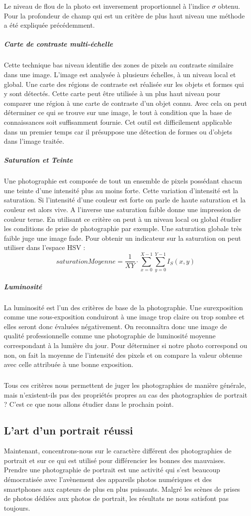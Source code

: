 \documentclass[11pt, french,screen]{report-rd-info}
\begin{document}
Le niveau de flou de la photo est inversement proportionnel à l’indice $\sigma$ obtenu. Pour la profondeur de champ qui est un critère de plus haut niveau une méthode a été expliquée précédemment.

\subparagraph{Carte de contraste multi-échelle}
Cette technique bas niveau identifie des zones de pixels au contraste similaire dans une image. L’image est analysée à plusieurs échelles, à un niveau local et global. Une carte des régions de contraste est réalisée sur les objets et formes qui y sont détectés. Cette carte peut être utilisée à un plus haut niveau pour comparer une région à une carte de contraste d’un objet connu. Avec cela on peut déterminer ce qui se trouve sur une image, le tout à condition que la base de connaissances soit suffisamment fournie. Cet outil est difficilement applicable dans un premier temps car il présuppose une détection de formes ou d’objets dans l’image traitée.
\subparagraph{Saturation et Teinte}
Une photographie est composée de tout un ensemble de pixels possédant chacun une teinte d’une intensité plus au moins forte. Cette variation d’intensité est la saturation. Si l’intensité d’une couleur est forte on parle de haute saturation et la couleur est alors vive. A l’inverse une saturation faible donne une impression de couleur terne. En utilisant ce critère on peut à un niveau local ou global étudier les conditions de prise de photographie par exemple. Une saturation globale très faible juge une image fade. Pour obtenir un indicateur sur la saturation on peut utiliser dans l'espace HSV : 
\begin{equation}
saturationMoyenne = \frac{1}{XY}\cdot \sum_{x=0}^{X-1} \sum_{y=0}^{Y-1} I_S(x,y)  
\end{equation}

\subparagraph{Luminosité}
La luminosité est l’un des critères de base de la photographie. Une surexposition  comme une sous-exposition conduiront à une image trop claire ou trop sombre et elles seront donc évaluées négativement. On reconnaîtra donc une image de qualité professionnelle comme une photographie de luminosité moyenne correspondant à la lumière du jour. Pour déterminer si notre photo correspond ou non, on fait la moyenne de l’intensité des pixels et on compare la valeur obtenue avec celle attribuée à une bonne exposition.
\subparagraph{}
Tous ces critères nous permettent de juger les photographies de manière générale, mais n'existent-ils pas des propriétés propres au cas des photographies de portrait ? C'est ce que nous allons étudier dans le prochain point.
\subsection{L’art d’un portrait réussi}
Maintenant, concentrons-nous sur le caractère différent des photographies de portrait et sur ce qui est utilisé pour différencier les bonnes des mauvaises.
Prendre une photographie de portrait est une activité qui s'est beaucoup démocratisée avec l'avènement des appareils photos numériques et des smartphones aux capteurs de plus en plus puissants. Malgré les scènes de prises de photos dédiées aux photos de portrait, les résultats ne nous satisfont pas toujours.
\end{document}
